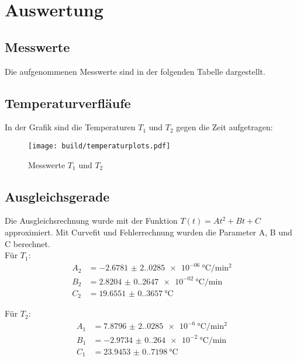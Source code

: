 \section{Auswertung}
\label{sec:Auswertung}

\subsection{Messwerte}
Die aufgenommenen Messwerte sind in der folgenden Tabelle dargestellt.
\begin{center}
\end{center}

\newpage

\subsection{Temperaturverfläufe}
In der Grafik sind die Temperaturen $T_1$ und $T_2$ gegen die Zeit aufgetragen:
\begin{figure}[H]
  \centering
  \texttt{[image: build/temperaturplots.pdf]}
  \caption{Messwerte $T_1$ und $T_2$}
\end{figure}

\subsection{Ausgleichsgerade}
Die Ausgleichsrechnung wurde mit der Funktion $T(t) = A t^2 + B t + C$ approximiert. Mit Curvefit und Fehlerrechnung 
wurden die Parameter A, B und C berechnet.\\
Für $T_1$:
\begin{align*}%
  A_2 &= \SI{-2.6781(2.0285)e-06}{\degreeCelsius\per\square\minute}\\
  B_2 &= \SI{2.8204(0.2647)e-02}{\degreeCelsius\per\minute}\\
  C_2 &= \SI{19.6551(0.3657)}{\degreeCelsius}
\end{align*}

Für $T_2$:
\begin{align*}
  A_1 &= \SI{7.8796(2.0285)e-6}{\degreeCelsius\per\square\minute}\\
  B_1 &= \SI{-2.9734(0.264)e-2}{\degreeCelsius\per\minute}\\
  C_1 &= \SI{23.9453(0.7198)}{\degreeCelsius}
\end{align*}

